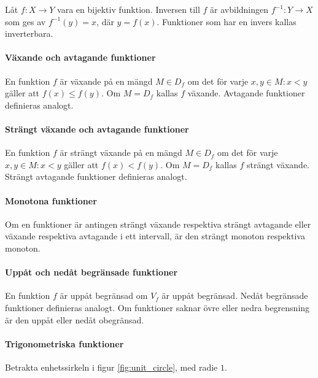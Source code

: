 Låt $f: X \to Y$ vara en bijektiv funktion. Inversen till $f$ är avbildningen $f^{-1}: Y\to X$ som ges av $f^{-1}(y)=x$, där $y=f(x)$. Funktioner som har en invers kallas inverterbara.

\paragraph{Växande och avtagande funktioner}

En funktion $f$ är växande på en mängd $M\in D_f$ om det för varje $x,y\in M: x<y$ gäller att $f(x)\leq f(y)$. Om $M=D_f$ kallas $f$ växande. Avtagande funktioner definieras analogt.

\paragraph{Strängt växande och avtagande funktioner}

En funktion $f$ är strängt växande på en mängd $M\in D_f$ om det för varje $x,y\in M: x<y$ gäller att $f(x)<f(y)$. Om $M=D_f$ kallas $f$ strängt växande. Strängt avtagande funktioner definieras analogt.

\paragraph{Monotona funktioner}

Om en funktioner är antingen strängt växande respektiva strängt avtagande eller växande respektiva avtagande i ett intervall, är den strängt monoton respektiva monoton.

\paragraph{Uppåt och nedåt begränsade funktioner}

En funktion $f$ är uppåt begränsad om $V_f$ är uppåt begränsad. Nedåt begränsade funktioner definieras analogt. Om funktioner saknar övre eller nedra begrensning är den uppåt eller nedåt obegränsad.

\paragraph{Trigonometriska funktioner}

Betrakta enhetssirkeln i figur \ref{fig:unit_circle}, med radie $1$.

